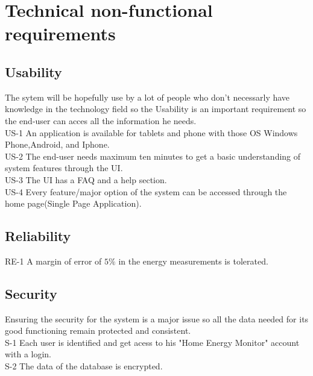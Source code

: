 \section{Technical non-functional requirements}

\subsection{Usability}
The sytem will be hopefully use by a lot of people who don't necessarly have knowledge in the technology field so the Usability is an important requirement so the end-user can acces all the information he needs. \\

US-1 An application is available for tablets and phone with those OS Windows Phone,Android, and Iphone. \\ %
US-2  The end-user needs maximum ten minutes to get a basic understanding of system features through the UI. \\
US-3  The UI has a FAQ and a help section. \\
US-4  Every feature/major option of the system can be accessed through the home page(Single Page Application). \\



\subsection{Reliability}
RE-1 A margin of error of $5\%$ in the energy measurements is tolerated. \\
 
\subsection{Security}
Ensuring the security for the system is a major issue so all the data needed for its good functioning remain protected and consistent. \\

S-1 Each user is identified and get acess to his "Home Energy Monitor" account with a login. \\
S-2 The data of the database is encrypted. \\ %


